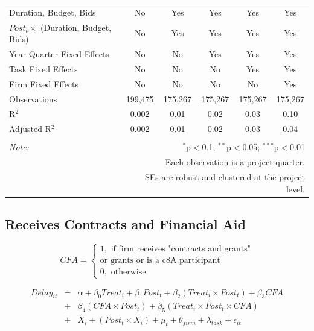 \documentclass[]{article}
\begin{document}
\begin{table}[H]
\begin{tabular}{@{\extracolsep{-2pt}}lccccc}
Duration, Budget, Bids & No & Yes & Yes & Yes & Yes \\ 
$Post_t \times $  (Duration, Budget, Bids) & No & Yes & Yes & Yes & Yes \\ 
Year-Quarter Fixed Effects & No & No & Yes & Yes & Yes \\ 
Task Fixed Effects & No & No & No & Yes & Yes \\ 
Firm Fixed Effects & No & No & No & No & Yes \\ 
Observations & 199,475 & 175,267 & 175,267 & 175,267 & 175,267 \\ 
R$^{2}$ & 0.002 & 0.01 & 0.02 & 0.03 & 0.10 \\ 
Adjusted R$^{2}$ & 0.002 & 0.01 & 0.02 & 0.03 & 0.04 \\ 
\hline 
\hline \\[-1.8ex] 
\textit{Note:}  & \multicolumn{5}{r}{$^{*}$p$<$0.1; $^{**}$p$<$0.05; $^{***}$p$<$0.01} \\ 
 & \multicolumn{5}{r}{Each observation is a project-quarter.} \\ 
 & \multicolumn{5}{r}{SEs are robust and clustered at the project level.} \\ 
\end{tabular} 
\end{table}

\hypertarget{receives-contracts-and-financial-aid}{%
\subsection{Receives Contracts and Financial
Aid}\label{receives-contracts-and-financial-aid}}

\[ CFA = \begin{cases} 1, \text{ if firm receives "contracts and grants"}\\ 
                       \text{or grants or is a c8A participant}\\
0, \text{ otherwise} \end{cases}\]

\[ \begin{aligned}
Delay_{it} &=& \alpha+\beta_0 Treat_i + \beta_1 Post_t + \beta_2 (Treat_i \times Post_t) +\beta_3 CFA \\
&+& \beta_4 (CFA \times Post_t) + \beta_5 (Treat_i \times Post_t \times CFA) \\ 
&+&X_i + (Post_t \times X_i) + \mu_t + \theta_{firm} + \lambda_{task}+ \epsilon_{it}
\end{aligned}\]
\end{document}
